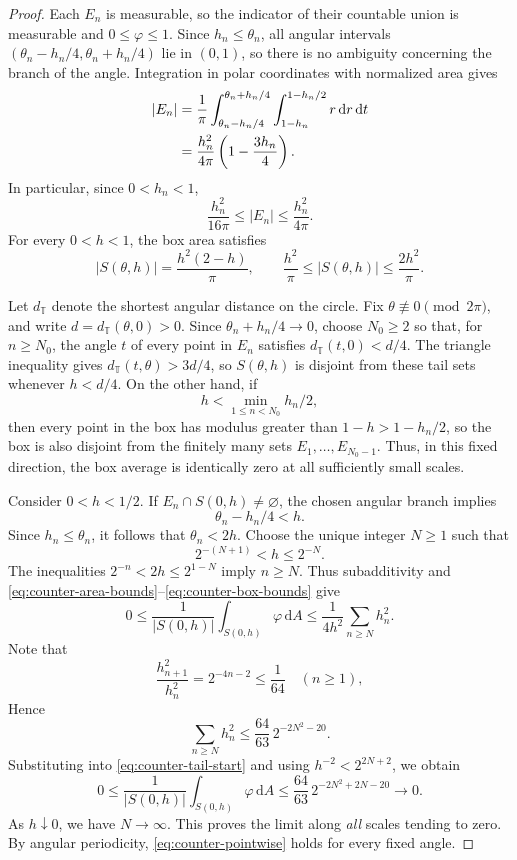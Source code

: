 \documentclass[12pt,a4paper]{article}
\theoremstyle{remark}
\newcommand{\dd}{\,\mathrm d}
\newcommand{\dA}{\,\mathrm dA}
\begin{document}
\begin{proof}
Each $E_n$ is measurable, so the indicator of their countable union is measurable and
$0\le\varphi\le1$. Since $h_n\le\theta_n$,
all angular intervals $(\theta_n-h_n/4,\theta_n+h_n/4)$ lie in $(0,1)$,
so there is no ambiguity concerning the branch of the angle. Integration in polar coordinates with normalized area gives
\begin{align}
|E_n|
&=\frac1\pi\int_{\theta_n-h_n/4}^{\theta_n+h_n/4}
                \int_{1-h_n}^{1-h_n/2}r\dd r\dd t\notag\\
&=\frac{h_n^2}{4\pi}\left(1-\frac{3h_n}{4}\right).
\label{eq:counter-area}
\end{align}
In particular, since $0<h_n<1$,
\begin{equation}\label{eq:counter-area-bounds}
\frac{h_n^2}{16\pi}\le |E_n|\le\frac{h_n^2}{4\pi}.
\end{equation}
For every $0<h<1$, the box area satisfies
\begin{equation}\label{eq:counter-box-bounds}
|S(\theta,h)|=\frac{h^2(2-h)}\pi,\qquad
\frac{h^2}\pi\le |S(\theta,h)|\le\frac{2h^2}\pi.
\end{equation}

\medskip
Let $d_{\mathbb T}$ denote the shortest angular distance on the circle. Fix
$\theta\not\equiv0\pmod{2\pi}$, and write $d=d_{\mathbb T}(\theta,0)>0$.
Since $\theta_n+h_n/4\to0$, choose $N_0\ge2$ so that, for $n\ge N_0$,
the angle $t$ of every point in $E_n$ satisfies $d_{\mathbb T}(t,0)<d/4$.
The triangle inequality gives $d_{\mathbb T}(t,\theta)>3d/4$,
so $S(\theta,h)$ is disjoint from these tail sets whenever $h<d/4$.
On the other hand, if
\[
h<\min_{1\le n<N_0}h_n/2,
\]
then every point in the box has modulus greater than $1-h>1-h_n/2$, so the box is also disjoint from the finitely many sets
$E_1,\ldots,E_{N_0-1}$.
Thus, in this fixed direction, the box average is identically zero at all sufficiently small scales.

\medskip
Consider $0<h<1/2$. If $E_n\cap S(0,h)\ne\varnothing$,
the chosen angular branch implies
\[
\theta_n-h_n/4<h.
\]
Since $h_n\le\theta_n$, it follows that $\theta_n<2h$.
Choose the unique integer $N\ge1$ such that
\[
2^{-(N+1)}<h\le2^{-N}.
\]
The inequalities $2^{-n}<2h\le2^{1-N}$ imply $n\ge N$.
Thus subadditivity and \eqref{eq:counter-area-bounds}--\eqref{eq:counter-box-bounds}
give
\begin{equation}\label{eq:counter-tail-start}
0\le\frac1{|S(0,h)|}\int_{S(0,h)}\varphi\dA
\le\frac1{4h^2}\sum_{n\ge N}h_n^2.
\end{equation}
Note that
\[
\frac{h_{n+1}^2}{h_n^2}=2^{-4n-2}\le\frac1{64}\quad(n\ge1),
\]
Hence
\[
\sum_{n\ge N}h_n^2\le\frac{64}{63}\,2^{-2N^2-20}.
\]
Substituting into \eqref{eq:counter-tail-start} and using $h^{-2}<2^{2N+2}$, we obtain
\[
0\le\frac1{|S(0,h)|}\int_{S(0,h)}\varphi\dA
\le\frac{64}{63}\,2^{-2N^2+2N-20}\longrightarrow0.
\]
As $h\downarrow0$, we have $N\to\infty$. This proves the limit along \emph{all} scales tending to zero. By angular periodicity,
\eqref{eq:counter-pointwise} holds for every fixed angle.


\end{proof}
\end{document}
